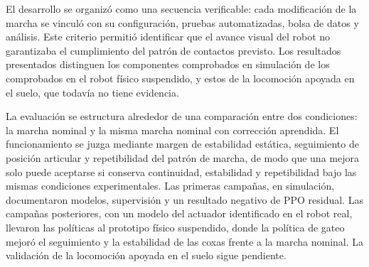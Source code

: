 El desarrollo se organizó como una secuencia verificable: cada modificación de
la marcha se vinculó con su configuración, pruebas automatizadas, bolsa de datos
y análisis. Este criterio permitió identificar que el avance visual del robot
no garantizaba el cumplimiento del patrón de contactos previsto. Los resultados
presentados distinguen los componentes comprobados en simulación de los
comprobados en el robot físico suspendido, y estos de la locomoción apoyada en
el suelo, que todavía no tiene evidencia.

La evaluación se estructura alrededor de una comparación entre dos condiciones:
la marcha nominal y la misma marcha nominal con corrección aprendida. El
funcionamiento se juzga mediante margen de estabilidad estática, seguimiento de
posición articular y repetibilidad del patrón de marcha, de modo que una mejora
solo puede aceptarse si conserva continuidad, estabilidad y repetibilidad bajo
las mismas condiciones experimentales. Las primeras campañas, en simulación,
documentaron modelos, supervisión y un resultado negativo de PPO residual. Las
campañas posteriores, con un modelo del actuador identificado en el robot real,
llevaron las políticas al prototipo físico suspendido, donde la política de gateo
mejoró el seguimiento y la estabilidad de las coxas frente a la marcha nominal.
La validación de la locomoción apoyada en el suelo sigue pendiente.
